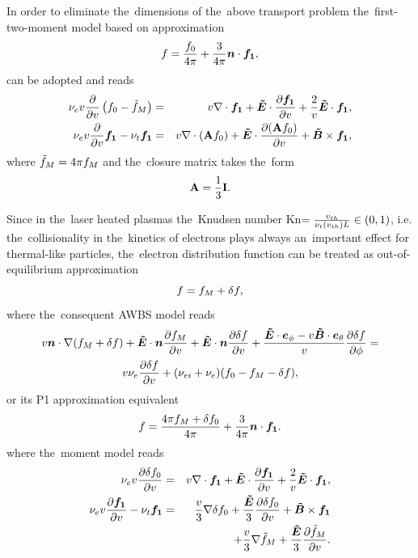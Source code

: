 \documentclass[preprint,12pt]{elsarticle}
\newcounter{bla}
\begin{document}
In order to eliminate the~dimensions of the~above transport problem 
the~first-two-moment model based on approximation 
\begin{equation}
  f = \frac{f_0}{4\pi} + \frac{3}{4\pi}\boldsymbol{n}\cdot\boldsymbol{f_1} , 
  \nonumber \label{eq:OOE_P1approximation}
\end{equation}
can be adopted and reads
\begin{eqnarray}
  \nu_{e}v\frac{\partial{}}{\partial{v}}\left(f_0 - \tilde{f}_M \right) &=&
  v\nabla\cdot\boldsymbol{f_1} + \boldsymbol{\tilde{E}}\cdot
  \frac{\partial{\boldsymbol{f_1}}}{\partial{v}} + \frac{2}{v}\boldsymbol{\tilde{E}}\cdot\boldsymbol{f_1} , 
  \nonumber \label{eq:OOE_P1f0}\\
  \nu_{e}v\frac{\partial{}}{\partial{v}}\boldsymbol{f_1} - \nu_{t}\boldsymbol{f_1} &=& 
  v\nabla\cdot\left(\mathbf{A}f_0\right) + 
  \boldsymbol{\tilde{E}}\cdot\frac{\partial{\left(\mathbf{A}f_0\right)}}{\partial{v}} + \boldsymbol{\tilde{B}}\times\boldsymbol{f_1} ,
  \nonumber \label{eq:OOE_P1f1}
\end{eqnarray}
where $\tilde{f}_M = 4\pi f_M$ and the~closure matrix takes the~form
\begin{equation}
  \mathbf{A} = \frac{1}{3}\mathbf{I} .
  \nonumber \label{eq:OOE_P1closure}
\end{equation}

Since in the~laser heated plasmas the~Knudsen number 
Kn$ = \frac{v_{th}}{\nu_t(v_{th}) L} \in (0, 1)$, i.e. the~collisionality in 
the~kinetics of electrons plays always an~important effect for thermal-like 
particles, the~electron distribution 
function can be treated as out-of-equilibrium approximation 
\begin{equation}
  f = f_M + \delta f ,
  \label{eq:OOE_outofeq}
\end{equation}  
where the~consequent AWBS model reads
\begin{multline}
  v\boldsymbol{n}\cdot\nabla (f_M + \delta f) + \boldsymbol{\tilde{E}}\cdot\boldsymbol{n} \frac{\partial{f_M}}{\partial{v}} 
  + \boldsymbol{\tilde{E}}\cdot\boldsymbol{n} \frac{\partial{\delta f}}{\partial{v}} 
  + \frac{\boldsymbol{\tilde{E}}\cdot\boldsymbol{e}_\phi 
  - v\boldsymbol{\tilde{B}}\cdot\boldsymbol{e}_\theta}{v}\frac{\partial{\delta f}}{\partial{\phi}}
  = \\
  v \nu_{e} \frac{\partial{\delta f}}{\partial{v}} 
  + (\nu_{ei} + \nu_{e}) (f_0 - f_M - \delta f) ,
  \label{eq:OOE_AWBS_model}
\end{multline}
or its P1 approximation equivalent
\begin{equation}
  f = \frac{4\pi f_M + \delta f_0}{4\pi} + \frac{3}{4\pi}\boldsymbol{n}\cdot\boldsymbol{f_1} .
  \label{eq:OOE_P1outofeq}
\end{equation}
where the~moment model reads
\begin{eqnarray}
  \nu_{e}v\frac{\partial{\delta f_0}}{\partial{v}} &=&
  v\nabla\cdot\boldsymbol{f_1} + \boldsymbol{\tilde{E}}\cdot
  \frac{\partial{\boldsymbol{f_1}}}{\partial{v}} + \frac{2}{v}\boldsymbol{\tilde{E}}\cdot\boldsymbol{f_1} , 
  \label{eq:OOE_P1f0}\\
  \nu_{e}v\frac{\partial{\boldsymbol{f_1}}}{\partial{v}} - \nu_{t}\boldsymbol{f_1} &=& 
  \frac{v}{3}\nabla\delta f_0 + 
  \frac{\boldsymbol{\tilde{E}}}{3}\frac{\partial{\delta f_0}}{\partial{v}} + \boldsymbol{\tilde{B}}\times\boldsymbol{f_1} 
  \nonumber \\
  & & + \frac{v}{3}\nabla\tilde{f}_M + \frac{\boldsymbol{\tilde{E}}}{3}\frac{\partial{\tilde{f}_M}}{\partial{v}} .
  \label{eq:OOE_P1f1}
\end{eqnarray}
\end{document}
